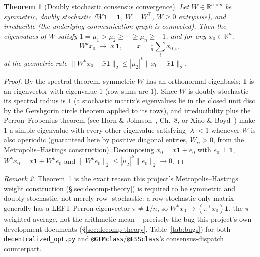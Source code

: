 \documentclass[11pt]{report}
\newcommand{\pkg}[1]{\texttt{#1}}
\theoremstyle{plain}
\newtheorem{theorem}{Theorem}[chapter]
\theoremstyle{definition}
\theoremstyle{remark}
\newtheorem{remark}[theorem]{Remark}
\begin{document}
\begin{theorem}[Doubly stochastic consensus convergence]
\label{thm:doubly-stochastic}
Let $W\in\mathbb{R}^{n\times n}$ be symmetric, doubly stochastic
($W\mathbf 1=\mathbf 1$, $W=W^\top$, $W\ge0$ entrywise), and
irreducible (the underlying communication graph is connected). Then the
eigenvalues of $W$ satisfy $1=\mu_1>\mu_2\ge\cdots\ge\mu_n\ge-1$, and
for any $x_0\in\mathbb{R}^n$,
\begin{equation}
W^k x_0 \;\longrightarrow\; \bar x\,\mathbf 1, \qquad \bar x=\tfrac1n\textstyle\sum_i x_{0,i},
\label{eq:consensus-limit}
\end{equation}
at the geometric rate $\|W^kx_0-\bar x\mathbf 1\|_2\le \left|\mu_2\right|^k\|x_0-\bar
x\mathbf1\|_2$.
\end{theorem}
\begin{proof}
By the spectral theorem, symmetric $W$ has an orthonormal eigenbasis;
$\mathbf1$ is an eigenvector with eigenvalue $1$ (row sums are $1$). Since
$W$ is doubly stochastic its spectral radius is $1$ (a stochastic
matrix's eigenvalues lie in the closed unit disc by the
Gershgorin circle theorem applied to its rows), and irreducibility plus
the Perron--Frobenius theorem (see Horn \& Johnson~\cite{hornjohnson},
Ch.~8, or Xiao \& Boyd~\cite{xiaoboydconsensus}) make $1$ a simple
eigenvalue with every other eigenvalue satisfying $|\lambda|<1$
whenever $W$ is also aperiodic (guaranteed here by
positive diagonal entries, $W_{ii}>0$, from the Metropolis--Hastings
construction). Decomposing $x_0=\bar x\mathbf1+e_0$ with $e_0\perp
\mathbf1$, $W^kx_0=\bar x\mathbf1+W^ke_0$ and $\|W^ke_0\|_2\le
\left|\mu_2\right|^k\|e_0\|_2\to0$.
\end{proof}

\begin{remark}
Theorem~\ref{thm:doubly-stochastic} is the exact reason this project's
Metropolis--Hastings weight construction (\S\ref{sec:decomp-theory}) is
required to be symmetric and doubly stochastic, not merely row-
stochastic: a row-stochastic-only matrix generally has a LEFT Perron
eigenvector $\pi\ne\mathbf1/n$, so $W^kx_0\to(\pi^\top x_0)\mathbf1$, the
$\pi$-weighted average, not the arithmetic mean -- precisely the bug this
project's own development documents (\S\ref{sec:decomp-theory},
Table~\ref{tab:bugs}) for both \pkg{decentralized\_\hspace{0pt}opt.py}
and \pkg{@GFMclass}/\pkg{@ESSclass}'s consensus-dispatch counterpart.
\end{remark}
\end{document}
